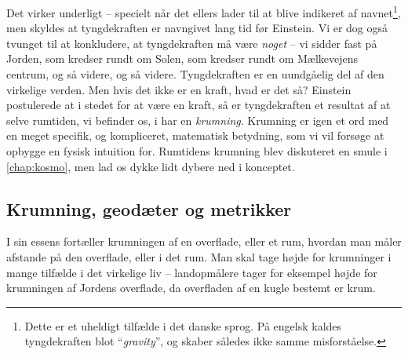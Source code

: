 \documentclass[crop=false, class=memoir]{standalone}
\begin{document}
Det virker underligt -- specielt når det ellers lader til at blive indikeret af navnet\footnote{Dette er et uheldigt tilfælde i det danske sprog. På engelsk kaldes tyngdekraften blot ``\emph{gravity}'', og skaber således ikke samme misforståelse.}, men skyldes at tyngdekraften er navngivet lang tid før Einstein. Vi er dog også tvunget til at konkludere, at tyngdekraften må være \emph{noget} -- vi sidder fast på Jorden, som kredser rundt om Solen, som kredser rundt om Mælkevejens centrum, og så videre, og så videre. Tyngdekraften er en uundgåelig del af den virkelige verden. Men hvis det ikke er en kraft, hvad er det så? Einstein postulerede at i stedet for at være en kraft, så er tyngdekraften et resultat af at selve rumtiden, vi befinder os, i har en \emph{krumning}. Krumning er igen et ord med en meget specifik, og kompliceret, matematisk betydning, som vi vil forsøge at opbygge en fysisk intuition for. Rumtidens krumning blev diskuteret en smule i \cref{chap:kosmo}, men lad os dykke lidt dybere ned i konceptet. 

\subsection{Krumning, geodæter og metrikker}
I sin essens fortæller krumningen af en overflade, eller et rum, hvordan man måler afstande på den overflade, eller i det rum. Man skal tage højde for krumninger i mange tilfælde i det virkelige liv -- landopmålere tager for eksempel højde for krumningen af Jordens overflade, da overfladen af en kugle bestemt er krum.
\end{document}
